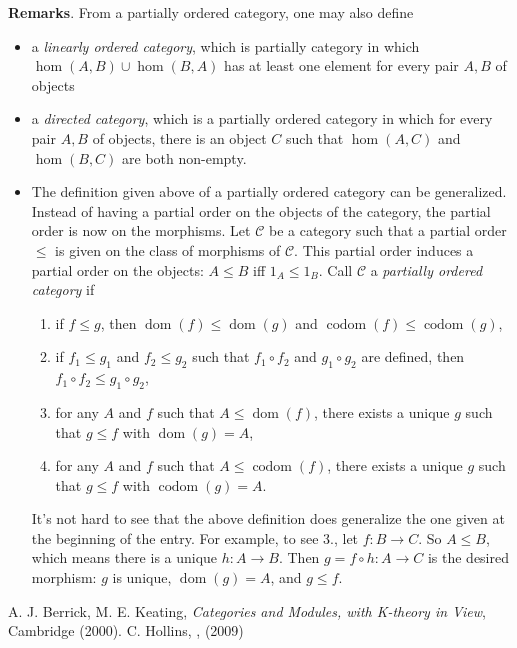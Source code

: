 \documentclass[12pt]{article}
\begin{document}
\textbf{Remarks}.  From a partially ordered category, one may also define 
\begin{itemize}
\item
a \emph{linearly ordered category}, which is partially category in which $\hom(A,B)\cup \hom(B,A)$ has at least one element for every pair $A,B$ of objects
\item
a \emph{directed category}, which is a partially ordered category in which for every pair $A,B$ of objects, there is an object $C$ such that $\hom(A,C)$ and $\hom(B,C)$ are both non-empty.
\item
The definition given above of a partially ordered category can be generalized.  Instead of having a partial order on the objects of the category, the partial order is now on the morphisms.  Let $\mathcal{C}$ be a category such that a partial order $\le$ is given on the class of morphisms of $\mathcal{C}$.  This partial order induces a partial order on the objects: $A\le B$ iff $1_A\le 1_B$.  Call $\mathcal{C}$ a \emph{partially ordered category} if
\begin{enumerate}
\item if $f\le g$, then $\operatorname{dom}(f)\le \operatorname{dom}(g)$ and $\operatorname{codom}(f)\le \operatorname{codom}(g)$,
\item if $f_1\le g_1$ and $f_2\le g_2$ such that $f_1\circ f_2$ and $g_1\circ g_2$ are defined, then $f_1\circ f_2 \le g_1\circ g_2$,
\item for any $A$ and $f$ such that $A\le \operatorname{dom}(f)$, there exists a unique $g$ such that $g\le f$ with $\operatorname{dom}(g)=A$,
\item for any $A$ and $f$ such that $A\le \operatorname{codom}(f)$, there exists a unique $g$ such that $g\le f$ with $\operatorname{codom}(g)=A$.
\end{enumerate}
It's not hard to see that the above definition does generalize the one given at the beginning of the entry.  For example, to see 3., let $f:B\to C$.  So $A\le B$, which means there is a unique $h:A\to B$.  Then $g= f\circ h:A\to C$ is the desired morphism: $g$ is unique, $\operatorname{dom}(g)=A$, and $g\le f$.
\end{itemize}

\begin{thebibliography}{9}
 A. J. Berrick, M. E. Keating, {\em Categories and Modules, with K-theory in View}, Cambridge (2000).
 C. Hollins, {\em {}}, (2009)
\end{thebibliography}
\end{document}
